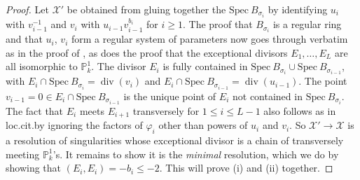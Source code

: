 \documentclass[12pt]{amsart}
\numberwithin{equation}{section}
\theoremstyle{definition}
\newcommand{\padma}[1]{{\color{Magenta} \sf $\clubsuit\clubsuit\clubsuit$ Padma: [#1]}}
\newcommand{\mc}[1]{\mathcal{#1}}
\newcommand{\proj}{\mathbb P}
\renewcommand{\phi}{\varphi}
\newcommand{\Spec}{\mathrm{Spec} \ }
\DeclareMathOperator{\divi}{div}
\begin{document}
\begin{proof}

Let $\mc{X}'$ be obtained from gluing together the $\Spec
B_{\sigma_i}$ by identifying $u_i$ with $v_{i-1}^{-1}$ and $v_i$ with
$u_{i-1}v_{i-1}^{b_i}$ for $i \geq 1$.  The proof that $B_{\sigma_i}$ is a regular ring and
that $u_i$, $v_i$ form a regular system of parameters now goes through
verbatim as in the proof of \cite[Proposition~4.4.2.5]{HN}, as does the proof that the exceptional divisors $E_1,
\ldots, E_L$ are all isomorphic to $\proj^1_k$.  The divisor $E_i$ is
fully contained in $\Spec B_{\sigma_i} \cup \Spec B_{\sigma_{i-1}}$,
with $E_i \cap \Spec B_{\sigma_i} = \divi(v_i)$ and
$E_{i} \cap \Spec B_{\sigma_{i-1}} = \divi(u_{i-1})$. The point
$v_{i-1} = 0 \in E_i \cap \Spec B_{\sigma_{i-1}}$ is the unique point of
$E_i$ not contained in $\Spec B_{\sigma_i}$.
The fact that
$E_i$ meets $E_{i+1}$ transversely for $1 \leq i \leq L-1$ also
follows as in loc.\;cit.\;by ignoring the factors of $\phi_i$
other than powers of $u_i$ and $v_i$.  So $\mc{X}' \to \mc{X}$ is a
resolution of singularities whose exceptional divisor is a chain of
transversely meeting $\proj^1_k$'s.  It remains to show it is the
\emph{minimal} resolution,
which we do by showing that $(E_i, E_i) = -b_i \leq -2$.  This will prove (i) and (ii) together.


\end{proof}
\end{document}
